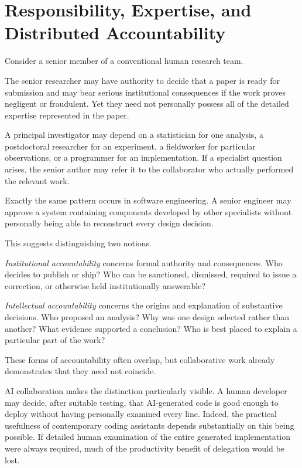 \section{Responsibility, Expertise, and Distributed Accountability}

Consider a senior member of a conventional human research team.

The senior researcher may have authority to decide that a paper is ready for submission and may bear serious institutional consequences if the work proves negligent or fraudulent. Yet they need not personally possess all of the detailed expertise represented in the paper.

A principal investigator may depend on a statistician for one analysis, a postdoctoral researcher for an experiment, a fieldworker for particular observations, or a programmer for an implementation. If a specialist question arises, the senior author may refer it to the collaborator who actually performed the relevant work.

Exactly the same pattern occurs in software engineering. A senior engineer may approve a system containing components developed by other specialists without personally being able to reconstruct every design decision.

This suggests distinguishing two notions.

\emph{Institutional accountability} concerns formal authority and consequences. Who decides to publish or ship? Who can be sanctioned, dismissed, required to issue a correction, or otherwise held institutionally answerable?

\emph{Intellectual accountability} concerns the origins and explanation of substantive decisions. Who proposed an analysis? Why was one design selected rather than another? What evidence supported a conclusion? Who is best placed to explain a particular part of the work?

These forms of accountability often overlap, but collaborative work already demonstrates that they need not coincide.

AI collaboration makes the distinction particularly visible. A human developer may decide, after suitable testing, that AI-generated code is good enough to deploy without having personally examined every line. Indeed, the practical usefulness of contemporary coding assistants depends substantially on this being possible. If detailed human examination of the entire generated implementation were always required, much of the productivity benefit of delegation would be lost.

